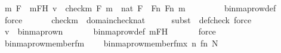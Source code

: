 \begin{isabellebody}
\ m\ F\ \ mFH{\isacharcolon}{\kern0pt}\ {\isachardoublequoteopen}v\ {\isacharequal}{\kern0pt}\ {\isacharless}{\kern0pt}check{\isacharparenleft}{\kern0pt}m{\isacharparenright}{\kern0pt}{\isacharcomma}{\kern0pt}\ F{\isachargreater}{\kern0pt}{\isachardoublequoteclose}\ {\isachardoublequoteopen}m\ {\isasymin}\ nat{\isachardoublequoteclose}\ {\isachardoublequoteopen}F\ {\isasymin}\ Fn{\isachardoublequoteclose}\ {\isachardoublequoteopen}F{\isacharbackquote}{\kern0pt}{\isacharless}{\kern0pt}n{\isacharcomma}{\kern0pt}\ m{\isachargreater}{\kern0pt}\ {\isacharequal}{\kern0pt}\ {}{\isachardoublequoteclose}\ \isanewline
\ \ \ \ \isamarkupfalse%
\ binmap{\isacharunderscore}{\kern0pt}row{\isacharprime}{\kern0pt}{\isacharunderscore}{\kern0pt}def\ \isanewline
\ \ \ \ \isamarkupfalse%
\ force\ \isanewline
\ \ \isamarkupfalse%
\ \isamarkupfalse%
\ {\isachardoublequoteopen}check{\isacharparenleft}{\kern0pt}m{\isacharparenright}{\kern0pt}\ {\isasymin}\ domain{\isacharparenleft}{\kern0pt}check{\isacharparenleft}{\kern0pt}nat{\isacharparenright}{\kern0pt}{\isacharparenright}{\kern0pt}{\isachardoublequoteclose}\ \isanewline
\ \ \ \ \isamarkupfalse%
{\isacharparenleft}{\kern0pt}subst\ {\isacharparenleft}{\kern0pt}{}{\isacharparenright}{\kern0pt}\ def{\isacharunderscore}{\kern0pt}check{\isacharcomma}{\kern0pt}\ force{\isacharparenright}{\kern0pt}\isanewline
\ \ \isamarkupfalse%
\ \isamarkupfalse%
\ {\isachardoublequoteopen}v\ {\isasymin}\ binmap{\isacharunderscore}{\kern0pt}row{\isacharprime}{\kern0pt}{\isacharparenleft}{\kern0pt}n{\isacharparenright}{\kern0pt}{\isachardoublequoteclose}\ \isanewline
\ \ \ \ \isamarkupfalse%
\ binmap{\isacharunderscore}{\kern0pt}row{\isacharprime}{\kern0pt}{\isacharunderscore}{\kern0pt}def\ mFH\ \isanewline
\ \ \ \ \isamarkupfalse%
\ force\ \isanewline
{}\isamarkupfalse%
%
\endisatagproof
{\isafoldproof}%
%
\isadelimproof
\isanewline
%
\endisadelimproof
\isanewline
{}\isamarkupfalse%
\ binmap{\isacharunderscore}{\kern0pt}row{\isacharprime}{\kern0pt}{\isacharunderscore}{\kern0pt}member{\isacharunderscore}{\kern0pt}fm\ \ \isanewline
\ \ {\isachardoublequoteopen}binmap{\isacharunderscore}{\kern0pt}row{\isacharprime}{\kern0pt}{\isacharunderscore}{\kern0pt}member{\isacharunderscore}{\kern0pt}fm{\isacharparenleft}{\kern0pt}x{\isacharcomma}{\kern0pt}\ n{\isacharcomma}{\kern0pt}\ fn{\isacharcomma}{\kern0pt}\ N{\isacharparenright}{\kern0pt}\ {\isasymequiv}\ \isanewline

\end{isabellebody}
